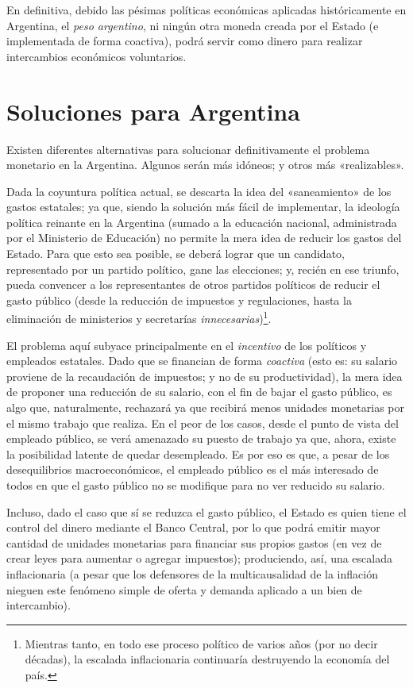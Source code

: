 \documentclass[12pt,a4paper,twoside]{book}
\begin{document}
En definitiva, debido las pésimas políticas económicas aplicadas históricamente en Argentina, el \textit{peso argentino}, ni ningún otra moneda creada por el Estado (e implementada de forma coactiva), podrá servir como dinero para realizar intercambios económicos voluntarios.

\section{Soluciones para Argentina}
Existen diferentes alternativas para solucionar definitivamente el problema monetario en la Argentina. Algunos serán más idóneos; y otros más «realizables».

Dada la coyuntura política actual, se descarta la idea del «saneamiento» de los gastos estatales; ya que, siendo la solución más fácil de implementar, la ideología política reinante en la Argentina (sumado a la educación nacional, administrada por el Ministerio de Educación) no permite la mera idea de reducir los gastos del Estado. Para que esto sea posible, se deberá lograr que un candidato, representado por un partido político, gane las elecciones; y, recién en ese triunfo, pueda convencer a los representantes de otros partidos políticos de reducir el gasto público (desde la reducción de impuestos y regulaciones, hasta la eliminación de ministerios y secretarías \textit{innecesarias})\footnote{Mientras tanto, en todo ese proceso político de varios años (por no decir décadas), la escalada inflacionaria continuaría destruyendo la economía del país.}.

El problema aquí subyace principalmente en el \textit{incentivo} de los políticos y empleados estatales. Dado que se financian de forma \textit{coactiva} (esto es: su salario proviene de la recaudación de impuestos; y no de su productividad), la mera idea de proponer una reducción de su salario, con el fin de bajar el gasto público, es algo que, naturalmente, rechazará ya que recibirá menos unidades monetarias por el mismo trabajo que realiza. En el peor de los casos, desde el punto de vista del empleado público, se verá amenazado su puesto de trabajo ya que, ahora, existe la posibilidad latente de quedar desempleado. Es por eso es que, a pesar de los desequilibrios macroeconómicos, el empleado público es el más interesado de todos en que el gasto público no se modifique para no ver reducido su salario.

Incluso, dado el caso que sí se reduzca el gasto público, el Estado es quien tiene el control del dinero mediante el Banco Central, por lo que podrá emitir mayor cantidad de unidades monetarias para financiar sus propios gastos (en vez de crear leyes para aumentar o agregar impuestos); produciendo, así, una escalada inflacionaria (a pesar que los defensores de la multicausalidad de la inflación nieguen este fenómeno simple de oferta y demanda aplicado a un bien de intercambio).
\end{document}
